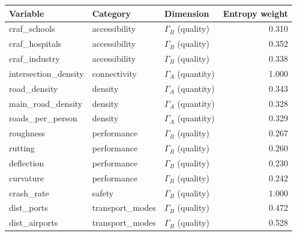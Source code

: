 \begin{tabular}{lllr}
\hline
Variable & Category & Dimension & Entropy weight \\
\hline
craf\_schools & accessibility & $\Gamma_B$ (quality) & 0.310 \\
craf\_hospitals & accessibility & $\Gamma_B$ (quality) & 0.352 \\
craf\_industry & accessibility & $\Gamma_B$ (quality) & 0.338 \\
intersection\_density & connectivity & $\Gamma_A$ (quantity) & 1.000 \\
road\_density & density & $\Gamma_A$ (quantity) & 0.343 \\
main\_road\_density & density & $\Gamma_A$ (quantity) & 0.328 \\
roads\_per\_person & density & $\Gamma_A$ (quantity) & 0.329 \\
roughness & performance & $\Gamma_B$ (quality) & 0.267 \\
rutting & performance & $\Gamma_B$ (quality) & 0.260 \\
deflection & performance & $\Gamma_B$ (quality) & 0.230 \\
curvature & performance & $\Gamma_B$ (quality) & 0.242 \\
crash\_rate & safety & $\Gamma_B$ (quality) & 1.000 \\
dist\_ports & transport_modes & $\Gamma_B$ (quality) & 0.472 \\
dist\_airports & transport_modes & $\Gamma_B$ (quality) & 0.528 \\
\hline
\end{tabular}
